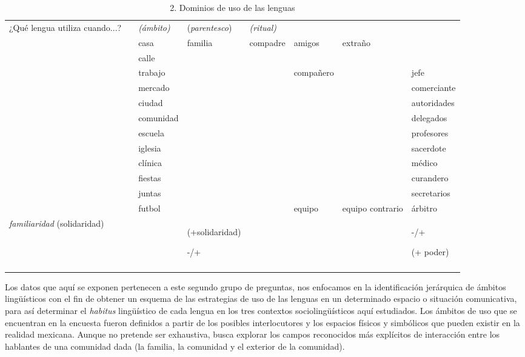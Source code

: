 \documentclass[output=paper]{../langscibook}
\begin{document}
\begin{table}
\caption{\label{tab:guerrero}2. Dominios de uso de las lenguas \citep[305]{Guerrero2016}}


\begin{tabularx}{\textwidth}{XXXXXXXX}

\lsptoprule
{¿Qué lengua utiliza cuando...?} &  & {\textit{(ámbito)}} & {(\textit{parentesco})} & {\textit{(ritual)}} &  &  & \multicolumn{1}{c}{}\\
&  & {casa} & {familia} & {compadre} & {amigos} & {extraño} & \\
&  & {calle} &  &  &  &  & \\
&  & {trabajo} &  &  & {compañero} &  & {jefe}\\
&  & {mercado} &  &  &  &  & {comerciante}\\
&  & {ciudad} &  &  &  &  & {autoridades}\\
&  & {comunidad} &  &  &  &  & {delegados}\\
&  & {escuela} &  &  &  &  & {profesores}\\
&  & {iglesia} &  &  &  &  & {sacerdote}\\
&  & {clínica} &  &  &  &  & {médico}\\
&  & {fiestas} &  &  &  &  & {curandero}\\
&  & {juntas} &  &  &  &  & {secretarios}\\
&  & {futbol} &  &  & {equipo} & {equipo contrario} & {árbitro}\\
{\textit{familiaridad} (solidaridad)} &  &  & {(+solidaridad)}

{{}-/+} &  &  &  & {{}-/+}

{(+ poder)}\\
\lspbottomrule
\end{tabularx}
\end{table}

Los datos que aquí se exponen pertenecen a este segundo grupo de preguntas, nos enfocamos en la identificación jerárquica de ámbitos lingüísticos con el fin de obtener un esquema de las estrategias de uso de las lenguas en un determinado espacio o situación comunicativa, para así determinar el \textit{habitus} lingüístico de cada lengua en los tres contextos sociolingüísticos aquí estudiados. Los ámbitos de uso que se encuentran en la encuesta fueron definidos a partir de los posibles interlocutores y los espacios físicos y simbólicos que pueden existir en la realidad mexicana. Aunque no pretende ser exhaustiva, busca explorar los campos reconocidos más explícitos de interacción entre los hablantes de una comunidad dada (la familia, la comunidad y el exterior de la comunidad).
\end{document}
